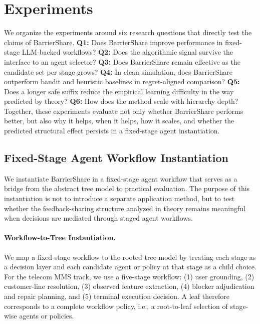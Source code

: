 \documentclass{article}
\begin{document}
\section{Experiments}

We organize the experiments around six research questions that directly test the claims of BarrierShare. 
\textbf{Q1:} Does BarrierShare improve performance in fixed-stage LLM-backed workflows? 
\textbf{Q2:} Does the algorithmic signal survive the interface to an agent selector? 
\textbf{Q3:} Does BarrierShare remain effective as the candidate set per stage grows? 
\textbf{Q4:} In clean simulation, does BarrierShare outperform bandit and heuristic baselines in regret-aligned comparison? 
\textbf{Q5:} Does a longer safe suffix reduce the empirical learning difficulty in the way predicted by theory? 
\textbf{Q6:} How does the method scale with hierarchy depth? 
Together, these experiments evaluate not only whether BarrierShare performs better, but also why it helps, when it helps, how it scales, and whether the predicted structural effect persists in a fixed-stage agent instantiation.

\subsection{Fixed-Stage Agent Workflow Instantiation}

We instantiate BarrierShare in a fixed-stage agent workflow that serves as a bridge from the abstract tree model to practical evaluation. The purpose of this instantiation is not to introduce a separate application method, but to test whether the feedback-sharing structure analyzed in theory remains meaningful when decisions are mediated through staged agent workflows.

\paragraph{Workflow-to-Tree Instantiation.}
We map a fixed-stage workflow to the rooted tree model by treating each stage as a decision layer and each candidate agent or policy at that stage as a child choice. For the telecom MMS track, we use a five-stage workflow:
(1) user grounding,
(2) customer-line resolution,
(3) observed feature extraction,
(4) blocker adjudication and repair planning, and
(5) terminal execution decision.
A leaf therefore corresponds to a complete workflow policy, i.e., a root-to-leaf selection of stage-wise agents or policies.
\end{document}
